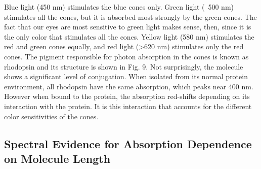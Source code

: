 Blue light (450 nm) stimulates the blue cones only.  Green light (~500 nm) stimulates all the cones, but it is absorbed most strongly by the green cones.  The fact that our eyes are most sensitive to green light makes sense, then, since it is the only color that stimulates all the cones.  Yellow light (580 nm) stimulates the red and green cones equally, and red light (>620 nm) stimulates only the red cones. 
The pigment responsible for photon absorption in the cones is known as rhodopsin and its structure is shown in Fig. 9. Not surprisingly, the molecule shows a significant level of conjugation. When isolated from its normal protein environment, all rhodopsin have the same absorption, which peaks near 400 nm. However when bound to the protein, the absorption red-shifts depending on its interaction with the protein. It is this interaction that accounts for the different color sensitivities of the cones.

\subsection{Spectral Evidence for Absorption Dependence on Molecule Length}

